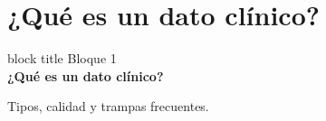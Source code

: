 \documentclass[aspectratio=169,10pt]{beamer}
\begin{document}
\section{¿Qué es un dato clínico?}

\begin{frame}[plain]
  \begin{center}
    \vspace{14mm}
    \begin{beamercolorbox}[sep=22pt,center,rounded=true,shadow=true]{block title}
      {\large Bloque 1}\\[4mm]
      \LARGE\bfseries ¿Qué es un dato clínico?
    \end{beamercolorbox}
    \vspace{8mm}
    {\large\color{UCgray} Tipos, calidad y trampas frecuentes.}
  \end{center}
\end{frame}
\end{document}
